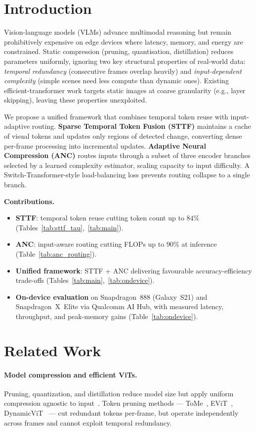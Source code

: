 \documentclass{article}
\begin{document}
\section{Introduction}
Vision-language models (VLMs) advance multimodal reasoning but remain prohibitively expensive on edge devices where latency, memory, and energy are constrained. Static compression (pruning, quantisation, distillation) reduces parameters uniformly, ignoring two key structural properties of real-world data: \emph{temporal redundancy} (consecutive frames overlap heavily) and \emph{input-dependent complexity} (simple scenes need less compute than dynamic ones). Existing efficient-transformer work targets static images at coarse granularity (e.g., layer skipping), leaving these properties unexploited.

We propose a unified framework that combines temporal token reuse with input-adaptive routing. \textbf{Sparse Temporal Token Fusion (STTF)} maintains a cache of visual tokens and updates only regions of detected change, converting dense per-frame processing into incremental updates. \textbf{Adaptive Neural Compression (ANC)} routes inputs through a subset of three encoder branches selected by a learned complexity estimator, scaling capacity to input difficulty. A Switch-Transformer-style load-balancing loss prevents routing collapse to a single branch.

\noindent\textbf{Contributions.}
\begin{itemize}
\item \textbf{STTF}: temporal token reuse cutting token count up to $84\%$ (Tables~\ref{tab:sttf_tau},~\ref{tab:main}).
\item \textbf{ANC}: input-aware routing cutting FLOPs up to $90\%$ at inference (Table~\ref{tab:anc_routing}).
\item \textbf{Unified framework}: STTF + ANC delivering favourable accuracy-efficiency trade-offs (Tables~\ref{tab:main},~\ref{tab:ondevice}).
\item \textbf{On-device evaluation} on Snapdragon~888 (Galaxy~S21) and Snapdragon~X~Elite via Qualcomm AI Hub, with measured latency, throughput, and peak-memory gains (Table~\ref{tab:ondevice}).
\end{itemize}


\section{Related Work}

\paragraph{Model compression and efficient ViTs.}
Pruning, quantization, and distillation reduce model size but apply uniform compression agnostic to input~\cite{han2016deepcompression, hinton2015distillation}. Token pruning methods --- ToMe~\cite{bolya2023tome}, EViT~\cite{liang2022evit}, DynamicViT~\cite{rao2021dynamicvit} --- cut redundant tokens per-frame, but operate independently across frames and cannot exploit temporal redundancy.
\end{document}
